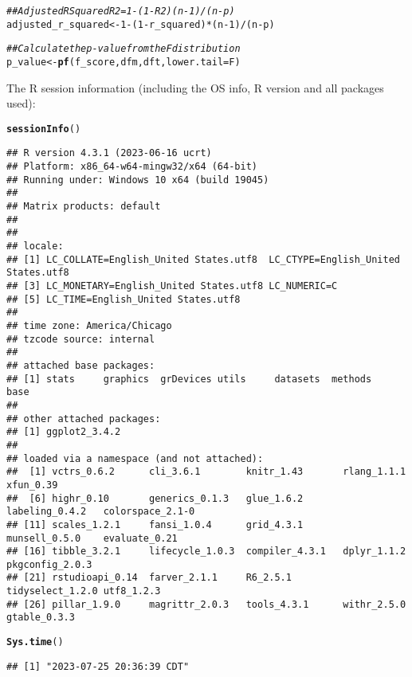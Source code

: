 \documentclass{article}\usepackage[]{graphicx}\usepackage[]{xcolor}
\makeatletter
\newcommand{\hlnum}[1]{\textcolor[rgb]{0.686,0.059,0.569}{#1}}%
\newcommand{\hlcom}[1]{\textcolor[rgb]{0.678,0.584,0.686}{\textit{#1}}}%
\newcommand{\hlopt}[1]{\textcolor[rgb]{0,0,0}{#1}}%
\newcommand{\hlstd}[1]{\textcolor[rgb]{0.345,0.345,0.345}{#1}}%
\newcommand{\hlkwb}[1]{\textcolor[rgb]{0.69,0.353,0.396}{#1}}%
\newcommand{\hlkwc}[1]{\textcolor[rgb]{0.333,0.667,0.333}{#1}}%
\newcommand{\hlkwd}[1]{\textcolor[rgb]{0.737,0.353,0.396}{\textbf{#1}}}%
\newenvironment{kframe}{%
 \def\at@end@of@kframe{}%
 \ifinner\ifhmode%
  \def\at@end@of@kframe{\end{minipage}}%
  \begin{minipage}{\columnwidth}%
 \fi\fi%
 \def\FrameCommand##1{\hskip\@totalleftmargin \hskip-\fboxsep
 \colorbox{shadecolor}{##1}\hskip-\fboxsep
     \hskip-\linewidth \hskip-\@totalleftmargin \hskip\columnwidth}%
 \MakeFramed {\advance\hsize-\width
   \@totalleftmargin\z@ \linewidth\hsize
   \@setminipage}}%
 {\par\unskip\endMakeFramed%
 \at@end@of@kframe}
\newenvironment{knitrout}{}{} %
\makeatother
\begin{document}
\begin{knitrout}
\begin{kframe}
\begin{alltt}
\hlcom{## Adjusted R Squared R2 = 1 - (1 - R2)(n - 1) / (n - p)}
\hlstd{adjusted_r_squared} \hlkwb{<-} \hlnum{1} \hlopt{-} \hlstd{(}\hlnum{1} \hlopt{-} \hlstd{r_squared)}\hlopt{*}\hlstd{(n} \hlopt{-} \hlnum{1}\hlstd{)} \hlopt{/} \hlstd{(n} \hlopt{-} \hlstd{p)}

\hlcom{## Calculate the p-value from the F distribution}
\hlstd{p_value} \hlkwb{<-} \hlkwd{pf}\hlstd{(f_score, dfm, dft,} \hlkwc{lower.tail}\hlstd{=F)}
\end{alltt}
\end{kframe}
\end{knitrout}

The R session information (including the OS info, R version and all
packages used):

\begin{knitrout}
\color{fgcolor}\begin{kframe}
\begin{alltt}
\hlkwd{sessionInfo}\hlstd{()}
\end{alltt}
\begin{verbatim}
## R version 4.3.1 (2023-06-16 ucrt)
## Platform: x86_64-w64-mingw32/x64 (64-bit)
## Running under: Windows 10 x64 (build 19045)
## 
## Matrix products: default
## 
## 
## locale:
## [1] LC_COLLATE=English_United States.utf8  LC_CTYPE=English_United States.utf8   
## [3] LC_MONETARY=English_United States.utf8 LC_NUMERIC=C                          
## [5] LC_TIME=English_United States.utf8    
## 
## time zone: America/Chicago
## tzcode source: internal
## 
## attached base packages:
## [1] stats     graphics  grDevices utils     datasets  methods   base     
## 
## other attached packages:
## [1] ggplot2_3.4.2
## 
## loaded via a namespace (and not attached):
##  [1] vctrs_0.6.2      cli_3.6.1        knitr_1.43       rlang_1.1.1      xfun_0.39       
##  [6] highr_0.10       generics_0.1.3   glue_1.6.2       labeling_0.4.2   colorspace_2.1-0
## [11] scales_1.2.1     fansi_1.0.4      grid_4.3.1       munsell_0.5.0    evaluate_0.21   
## [16] tibble_3.2.1     lifecycle_1.0.3  compiler_4.3.1   dplyr_1.1.2      pkgconfig_2.0.3 
## [21] rstudioapi_0.14  farver_2.1.1     R6_2.5.1         tidyselect_1.2.0 utf8_1.2.3      
## [26] pillar_1.9.0     magrittr_2.0.3   tools_4.3.1      withr_2.5.0      gtable_0.3.3
\end{verbatim}
\begin{alltt}
\hlkwd{Sys.time}\hlstd{()}
\end{alltt}
\begin{verbatim}
## [1] "2023-07-25 20:36:39 CDT"
\end{verbatim}
\end{kframe}
\end{knitrout}
\end{document}
